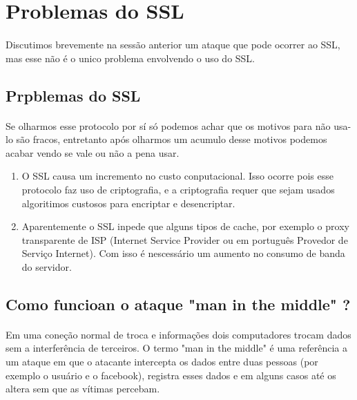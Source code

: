 \documentclass{article}
\begin{document}
  \newpage

  \section{Problemas do SSL}
  \paragraph{}
    Discutimos brevemente na sessão anterior um ataque que pode ocorrer ao SSL,
  mas esse não é o unico problema envolvendo o uso do SSL.

  \subsection{Prpblemas do SSL}
  \paragraph{}
  Se olharmos esse protocolo por sí só podemos achar que os motivos para não
  usa-lo são fracos, entretanto após olharmos um acumulo desse motivos podemos
  acabar vendo se vale ou não a pena usar.

  \begin{enumerate}
    \item O SSL causa um incremento no custo conputacional. Isso ocorre pois
    esse protocolo faz uso de criptografia, e a criptografia requer que sejam
    usados algoritimos custosos para encriptar e desencriptar.
    \item Aparentemente o SSL inpede que alguns tipos de cache, por exemplo o
    proxy transparente de ISP (Internet Service Provider ou em português
    Provedor de Serviço Internet). Com isso é nescessário um aumento no consumo
    de banda do servidor.
  \end{enumerate}

  \subsection{Como funcioan o ataque "man in the middle" ?}
  \paragraph{}
    Em uma coneção normal de troca e informações dois computadores trocam dados
  sem a interferência de terceiros. O termo "man in the middle" é uma referência
  a um ataque em que o atacante intercepta os dados entre duas pessoas (por
  exemplo o usuário e o facebook), registra esses dados e em alguns casos até
  os altera sem que as vítimas percebam.
\end{document}
